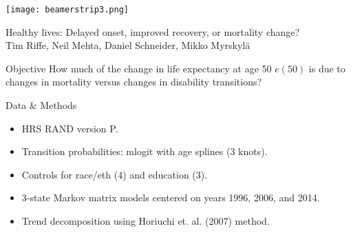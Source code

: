 \documentclass[20pt,usenames,dvipsnames]{beamer}
\begin{document}

\begin{frame}[plain]
	\vspace{-3cm}
 \centerline{\texttt{[image: beamerstrip3.png]}}
	\huge
	\vspace{1em}
	
	Healthy lives: Delayed onset, improved recovery, or mortality
change?\\
	\vspace{1em}
	\large 
	Tim Riffe, Neil Mehta, Daniel Schneider, Mikko Myrskyl\"a 
\end{frame}
\begin{frame}[plain]
\Large
\begin{block}{Objective}
How much of the change in life expectancy at age 50 $e(50)$ is due to changes in mortality versus changes in disability transitions?
\end{block}
\end{frame}
\begin{frame}[plain]
\Large
\begin{block}{Data \& Methods}
\begin{itemize}[<+->]
\item HRS RAND version P. 
\item Transition probabilities: mlogit with age splines (3 knots).
\item Controls for race/eth (4) and education (3). 
\item 3-state Markov matrix models centered on years 1996, 2006, and 2014. 
\item Trend decomposition using Horiuchi et. al. (2007) method.
\end{itemize}
\end{block}
\end{frame}

\begin{frame}[plain]
\Large
\begin{center}
\end{center}
\end{frame}
\end{document}

